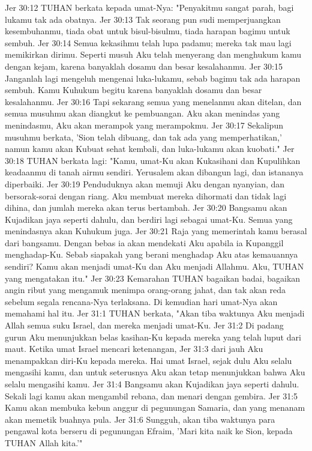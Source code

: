 Jer 30:12  TUHAN berkata kepada umat-Nya: "Penyakitmu sangat parah, bagi lukamu tak ada obatnya.
Jer 30:13  Tak seorang pun sudi memperjuangkan kesembuhanmu, tiada obat untuk bisul-bisulmu, tiada harapan bagimu untuk sembuh.
Jer 30:14  Semua kekasihmu telah lupa padamu; mereka tak mau lagi memikirkan dirimu. Seperti musuh Aku telah menyerang dan menghukum kamu dengan kejam, karena banyaklah dosamu dan besar kesalahanmu.
Jer 30:15  Janganlah lagi mengeluh mengenai luka-lukamu, sebab bagimu tak ada harapan sembuh. Kamu Kuhukum begitu karena banyaklah dosamu dan besar kesalahanmu.
Jer 30:16  Tapi sekarang semua yang menelanmu akan ditelan, dan semua musuhmu akan diangkut ke pembuangan. Aku akan menindas yang menindasmu, Aku akan merampok yang merampokmu.
Jer 30:17  Sekalipun musuhmu berkata, 'Sion telah dibuang, dan tak ada yang memperhatikan,' namun kamu akan Kubuat sehat kembali, dan luka-lukamu akan kuobati."
Jer 30:18  TUHAN berkata lagi: "Kamu, umat-Ku akan Kukasihani dan Kupulihkan keadaanmu di tanah airmu sendiri. Yerusalem akan dibangun lagi, dan istananya diperbaiki.
Jer 30:19  Penduduknya akan memuji Aku dengan nyanyian, dan bersorak-sorai dengan riang. Aku membuat mereka dihormati dan tidak lagi dihina, dan jumlah mereka akan terus bertambah.
Jer 30:20  Bangsamu akan Kujadikan jaya seperti dahulu, dan berdiri lagi sebagai umat-Ku. Semua yang menindasnya akan Kuhukum juga.
Jer 30:21  Raja yang memerintah kamu berasal dari bangsamu. Dengan bebas ia akan mendekati Aku apabila ia Kupanggil menghadap-Ku. Sebab siapakah yang berani menghadap Aku atas kemauannya sendiri? Kamu akan menjadi umat-Ku dan Aku menjadi Allahmu. Aku, TUHAN yang mengatakan itu."
Jer 30:23  Kemarahan TUHAN bagaikan badai, bagaikan angin ribut yang mengamuk menimpa orang-orang jahat, dan tak akan reda sebelum segala rencana-Nya terlaksana. Di kemudian hari umat-Nya akan memahami hal itu.
Jer 31:1  TUHAN berkata, "Akan tiba waktunya Aku menjadi Allah semua suku Israel, dan mereka menjadi umat-Ku.
Jer 31:2  Di padang gurun Aku menunjukkan belas kasihan-Ku kepada mereka yang telah luput dari maut. Ketika umat Israel mencari ketenangan,
Jer 31:3  dari jauh Aku menampakkan diri-Ku kepada mereka. Hai umat Israel, sejak dulu Aku selalu mengasihi kamu, dan untuk seterusnya Aku akan tetap menunjukkan bahwa Aku selalu mengasihi kamu.
Jer 31:4  Bangsamu akan Kujadikan jaya seperti dahulu. Sekali lagi kamu akan mengambil rebana, dan menari dengan gembira.
Jer 31:5  Kamu akan membuka kebun anggur di pegunungan Samaria, dan yang menanam akan memetik buahnya pula.
Jer 31:6  Sungguh, akan tiba waktunya para pengawal kota berseru di pegunungan Efraim, 'Mari kita naik ke Sion, kepada TUHAN Allah kita.'"
